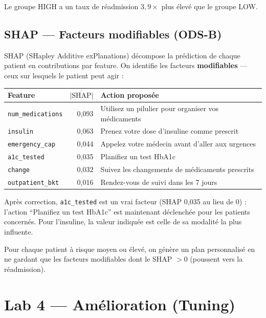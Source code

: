\documentclass[11pt,a4paper]{article}
\begin{document}
Le groupe HIGH a un taux de r\'eadmission $3{,}9\times$ plus \'elev\'e que le groupe LOW.

\subsection{SHAP --- Facteurs modifiables (ODS-B)}

SHAP (SHapley Additive exPlanations) d\'ecompose la pr\'ediction de chaque patient en contributions par feature. On identifie les facteurs \textbf{modifiables} --- ceux sur lesquels le patient peut agir :

\begin{center}
\small
\begin{tabularx}{\textwidth}{@{}lrX@{}}
\toprule
\textbf{Feature} & \textbf{$\overline{|\text{SHAP}|}$} & \textbf{Action propos\'ee} \\
\midrule
\texttt{num\_medications} & 0{,}093 & Utilisez un pilulier pour organiser vos m\'edicaments \\
\texttt{insulin} & 0{,}063 & Prenez votre dose d'insuline comme prescrit \\
\texttt{emergency\_cap} & 0{,}044 & Appelez votre m\'edecin avant d'aller aux urgences \\
\texttt{a1c\_tested} & 0{,}035 & Planifiez un test HbA1c \\
\texttt{change} & 0{,}032 & Suivez les changements de m\'edicaments prescrits \\
\texttt{outpatient\_bkt} & 0{,}016 & Rendez-vous de suivi dans les 7 jours \\
\bottomrule
\end{tabularx}
\end{center}

Apr\`es correction, \texttt{a1c\_tested} est un vrai facteur (SHAP 0{,}035 au lieu de 0) : l'action ``Planifiez un test HbA1c'' est maintenant d\'eclench\'ee pour les patients concern\'es. Pour l'insuline, la valeur indiqu\'ee est celle de sa modalit\'e la plus influente.

Pour chaque patient \`a risque moyen ou \'elev\'e, on g\'en\`ere un plan personnalis\'e en ne gardant que les facteurs modifiables dont le SHAP $> 0$ (poussent vers la r\'eadmission).


\section{Lab 4 --- Am\'elioration (Tuning)}
\end{document}
